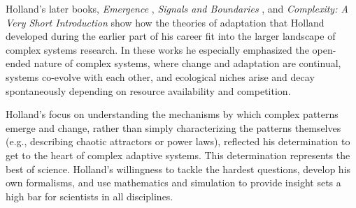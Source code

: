 \documentclass{sig-alternate}
\begin{document}





Holland's later books, \emph{Emergence} \cite{Holland2000},
\emph{Signals and Boundaries} \cite{Holland2012}, and
\emph{Complexity: A Very Short Introduction} \cite{Holland2014} show how the
theories of adaptation that Holland developed during the earlier part
of his career fit into the larger landscape of complex systems
research.  In these works he especially emphasized the open-ended
nature of complex systems, where change and adaptation are
continual, systems co-evolve with each other, and ecological niches arise
and decay spontaneously depending on resource availability and competition.


Holland's focus on understanding the mechanisms by which complex patterns emerge and change,
rather than simply characterizing the patterns themselves (e.g.,
describing chaotic attractors or power laws), reflected his
determination to get to the heart of complex adaptive systems.
This determination represents the best of science.  Holland's
willingness to tackle the hardest questions, develop his own
formalisms, and use mathematics and simulation to provide insight sets a high bar for
scientists in all disciplines.
\end{document}
